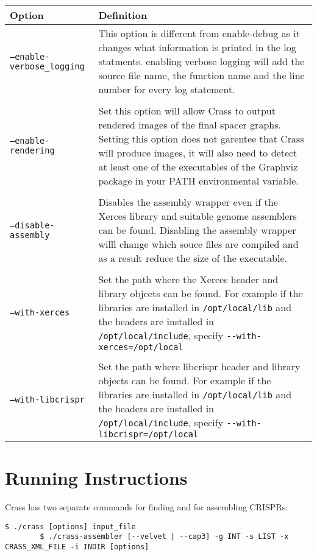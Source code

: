 \documentclass[11pt]{article} %
\newcommand{\longoptionflag}[1]{\texttt{--#1}}
\begin{document}
    \begin{longtable}{  l    p{10cm} }
    \hline
    Option & Definition \\  \hline\hline
   \longoptionflag{enable-verbose\_logging} & This option is different from enable-debug as it changes what information is printed in the log statments.  enabling verbose logging will add the source file name, the function name and the line number for every log statement. \\ \\    
\longoptionflag{enable-rendering} &  Set this option will allow Crass to output rendered images of the final spacer graphs.  Setting this option does not garentee that Crass will produce images, it will also need to detect at least one of the executables of the Graphviz package in your PATH environmental variable. \\  \\
   \longoptionflag{disable-assembly} & Disables the assembly wrapper even if the Xerces library and suitable genome assemblers can be found.  Disabling the assembly wrapper willl change which souce files are compiled and as a result reduce the size of the executable. \\ \\
\longoptionflag{with-xerces} & Set the path where the Xerces header and library objcets can be found.  For example if the libraries are installed in \lstinline$/opt/local/lib$ and the headers are installed in \lstinline$/opt/local/include$, specify \lstinline$--with-xerces=/opt/local$\\ \\
\longoptionflag{with-libcrispr} & Set the path where libcrispr header and library objects can be found. For example if the libraries are installed in \lstinline$/opt/local/lib$ and the headers are installed in \lstinline$/opt/local/include$, specify \lstinline$--with-libcrispr=/opt/local$\\

    \hline
    \end{longtable}

\section{Running Instructions}
Crass has two separate commands for finding and for assembling CRISPRs:
 \begin{lstlisting}[style=BashInputStyle]
	$ ./crass [options] input_file
        $ ./crass-assembler [--velvet | --cap3] -g INT -s LIST -x CRASS_XML_FILE -i INDIR [options]
\end{lstlisting}
\end{document}
